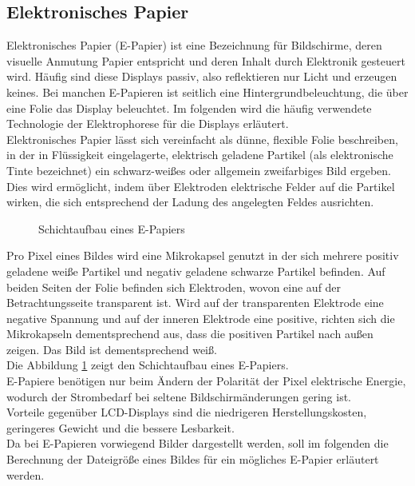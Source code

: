\subsection{Elektronisches Papier}
Elektronisches Papier (E-Papier) ist eine Bezeichnung für Bildschirme, deren visuelle Anmutung Papier entspricht und deren Inhalt durch Elektronik gesteuert wird. Häufig sind diese Displays passiv, also reflektieren nur Licht und erzeugen keines. Bei manchen E-Papieren ist seitlich eine Hintergrundbeleuchtung, die über eine Folie das Display beleuchtet. Im folgenden wird die häufig verwendete Technologie der Elektrophorese für die Displays erläutert. \\
\glqq Elektronisches Papier lässt sich vereinfacht als dünne, flexible Folie beschreiben, in der in Flüssigkeit eingelagerte, elektrisch geladene Partikel (als elektronische Tinte bezeichnet) ein schwarz-weißes oder allgemein zweifarbiges Bild ergeben. Dies wird ermöglicht, indem über Elektroden elektrische Felder auf die Partikel wirken, die sich entsprechend der Ladung des angelegten Feldes ausrichten. \grqq{} \cite[Seite 568]{Schryen.2002} \\
\begin{figure}[]
	\centering
	
	\caption[Schichtaufbau eines E-Papiers]{Schichtaufbau eines E-Papiers}
	\label{fig:epapier}
\end{figure}
Pro Pixel eines Bildes wird eine Mikrokapsel genutzt in der sich mehrere positiv geladene weiße Partikel und negativ geladene schwarze Partikel befinden. Auf beiden Seiten der Folie befinden sich Elektroden, wovon eine auf der Betrachtungsseite transparent ist. Wird auf der transparenten Elektrode eine negative Spannung und auf der inneren Elektrode eine positive, richten sich die Mikrokapseln dementsprechend aus, dass die positiven Partikel nach außen zeigen. Das Bild ist dementsprechend weiß. \cite[Vgl. Seite 567 f.]{Schryen.2002} \\
Die Abbildung \ref{fig:epapier} zeigt den Schichtaufbau eines E-Papiers.\\
E-Papiere benötigen nur beim Ändern der Polarität der Pixel elektrische Energie, wodurch der Strombedarf bei seltene Bildschirmänderungen gering ist. \\
Vorteile gegenüber LCD-Displays sind die niedrigeren Herstellungskosten, geringeres Gewicht und die bessere Lesbarkeit. \cite[Vgl. Seite 569]{Schryen.2002} \\
Da bei E-Papieren vorwiegend Bilder dargestellt werden, soll im folgenden die Berechnung der Dateigröße eines Bildes für ein mögliches E-Papier erläutert werden.

